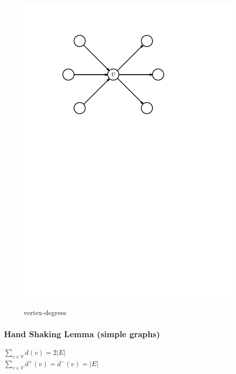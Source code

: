 \begin{figure}[htb]
{	\includegraphics[scale=.5]{01_graph_theory/pics/directed-graph_indegree-outdegree.pdf}
}
\caption{vertex-degrees}
\end{figure}
\FloatBarrier

\subsubsection*{Hand Shaking Lemma (simple graphs)}
$\sum_{v \in V} d(v) = 2 |E|$\\
$\sum_{v \in V} d^+(v) = d^-(v) = |E|$

